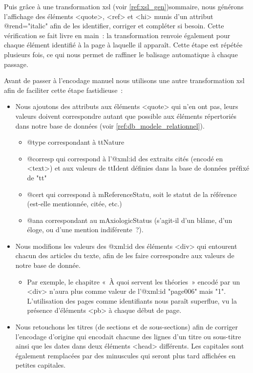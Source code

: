 Puis grâce à une transformation xsl (voir \ref{ref:xsl_gen})sommaire, nous générons l'affichage des éléments <quote>, <ref> et <hi> munis d'un attribut @rend="italic" afin de les identifier, corriger et compléter si besoin. Cette vérification se fait livre en main~: la transformation renvoie également pour chaque élément identifié à la page à laquelle il apparaît. Cette étape est répétée plusieurs fois, ce qui nous permet de raffiner le balisage automatique à chaque passage.

Avant de passer à l'encodage manuel nous utilisons une autre transformation xsl afin de faciliter cette étape fastidieuse~:
\begin{itemize}
    \item Nous ajoutons des attributs aux éléments <quote> qui n'en ont pas, leurs valeurs doivent correspondre autant que possible aux éléments répertoriés dans notre base de données (voir \ref{ref:db_modele_relationnel}).
    \begin{itemize}
        \item @type correspondant à ttNature
        \item @corresp qui correspond à l'@xml\NoAutoSpaceBeforeFDP:id des extraits cités (encodé en <text>) et aux valeurs de ttIdent définies dans la base de données préfixé de "tt"
        \item @cert qui correspond à mReferenceStatu, soit le statut de la référence (est-elle mentionnée, citée, etc.)
        \item @ana correspondant au mAxiologicStatus (s'agit-il d'un blâme, d'un éloge, ou d'une mention indiférente~?).
    \end{itemize}
    \item Nous modifions les valeurs des @xml\NoAutoSpaceBeforeFDP:id des éléments <div> qui entourent chacun des articles du texte, afin de les faire correspondre aux valeurs de notre base de donnée.
        \begin{itemize}
            \item Par exemple, le chapitre «~À quoi servent les théories~» encodé par un <div> n'aura plus comme valeur de l'@xml\NoAutoSpaceBeforeFDP:id "page006" mais "1". L'utilisation des pages comme identifiants nous paraît superflue, vu la présence d'éléments <pb> à chaque début de page.
        \end{itemize}
    \item Nous retouchons les titres (de sections et de sous-sections) afin de corriger l'encodage d'origine qui encodait chacune des lignes d'un titre ou sous-titre ainsi que les dates dans deux éléments <head> différents. Les capitales sont également remplacées par des minuscules qui seront plus tard affichées en petites capitales.

\end{itemize}
